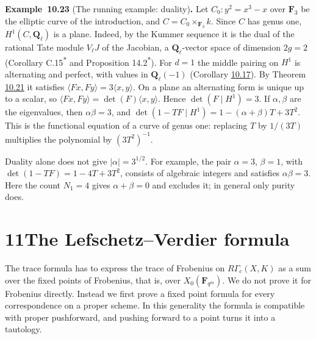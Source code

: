 \documentclass[11pt]{article}
\newenvironment{bpstatement}[2]{\par\addvspace{0.6\baselineskip}\noindent\textbf{#1}#2\textbf{.}\enspace\ignorespaces}
  {\par\addvspace{0.4\baselineskip}}
\newcommand{\bpout}[1]{#1\textsuperscript{\hyperlink{bp-outside}{\ensuremath{\ast}}}}
\begin{document}
\label{bp169}%
\begin{bpstatement}{Example~10.23}{ (The running example: duality)}
Let \(C_0\colon y^2=x^3-x\) over \(\mathbf F_3\) be the elliptic curve of the introduction, and \(C=C_0\times_{\mathbf F_3}k\). Since \(C\) has genus one, \(H^1(C,\mathbf Q_\ell)\) is a plane. Indeed, by the Kummer sequence it is the dual of the rational Tate module \(V_\ell J\) of the Jacobian, a \(\mathbf Q_\ell\)-vector space of dimension \(2g=2\) (Corollary \bpout{C.15} and Proposition \bpout{14.2}). For \(d=1\) the middle pairing on \(H^1\) is alternating and perfect, with values in \(\mathbf Q_\ell(-1)\) (Corollary \hyperref[bp152]{10.17}). By Theorem \hyperref[bp165]{10.21} it satisfies \(\langle Fx,Fy\rangle=3\langle x,y\rangle\). On a plane an alternating form is unique up to a scalar, so \(\langle Fx,Fy\rangle=\det(F)\langle
x,y\rangle\). Hence \(\det(F\mid H^1)=3\). If \(\alpha,\beta\) are the eigenvalues, then \(\alpha\beta=3\), and \(\det(1-TF\mid H^1)=1-(\alpha+\beta)T+3T^2\). This is the functional equation of a curve of genus one: replacing \(T\) by \(1/(3T)\) multiplies the polynomial by \((3T^2)^{-1}\).

Duality alone does not give \(|\alpha|=3^{1/2}\). For example, the pair \(\alpha=3\), \(\beta=1\), with \(\det(1-TF)=1-4T+3T^2\), consists of algebraic integers and satisfies \(\alpha\beta=3\). Here the count \(N_1=4\) gives \(\alpha+\beta=0\) and excludes it; in general only purity does.
\end{bpstatement}



\section*{\texorpdfstring{11\quad The Lefschetz–Verdier formula}{11 The Lefschetz–Verdier formula}}
\label{bp170}%
\label{bp171}%
The trace formula has to express the trace of Frobenius on \(R\Gamma_c(X,K)\) as a sum over the fixed points of Frobenius, that is, over \(X_0(\mathbf F_{q^m})\). We do not prove it for Frobenius directly. Instead we first prove a fixed point formula for every correspondence on a proper scheme. In this generality the formula is compatible with proper pushforward, and pushing forward to a point turns it into a tautology.
\end{document}
